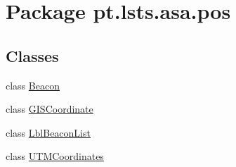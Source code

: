 \hypertarget{namespacept_1_1lsts_1_1asa_1_1pos}{}\section{Package pt.\+lsts.\+asa.\+pos}
\label{namespacept_1_1lsts_1_1asa_1_1pos}
\subsection*{Classes}
\begin{DoxyCompactItemize}
\item 
class \hyperlink{classpt_1_1lsts_1_1asa_1_1pos_1_1Beacon}{Beacon}
\item 
class \hyperlink{classpt_1_1lsts_1_1asa_1_1pos_1_1GISCoordinate}{G\+I\+S\+Coordinate}
\item 
class \hyperlink{classpt_1_1lsts_1_1asa_1_1pos_1_1LblBeaconList}{Lbl\+Beacon\+List}
\item 
class \hyperlink{classpt_1_1lsts_1_1asa_1_1pos_1_1UTMCoordinates}{U\+T\+M\+Coordinates}
\end{DoxyCompactItemize}
